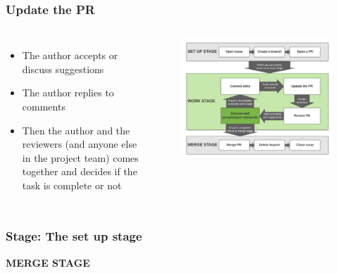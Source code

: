 \documentclass[aspectratio=169]{beamer} %
\begin{document}
\begin{frame}
	\frametitle{Update the PR}
	\begin{columns}[c]
		
		\begin{itemize}
			\setlength\itemsep{1em}
			\item The author accepts or discuss suggestions
			\item The author replies to comments
			\item Then the author and the reviewers (and anyone else in the project team) comes together and decides if the task is complete or not
		\end{itemize}
		
		\vspace{-.75cm}
		\begin{figure}
			\centering
			\includegraphics[width=\textwidth]{./img/branch-pr-merge-cycle-S2-4.png}
		\end{figure}
		
	\end{columns}
\end{frame}


\begin{frame}
	\frametitle{Stage: The set up stage}
	
	\huge\centering \textbf{MERGE STAGE}
	
\end{frame}
\end{document}

